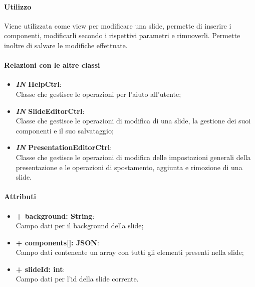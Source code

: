 	\paragraph{Utilizzo}
	Viene utilizzata come view per modificare una \gls{slide}, permette di inserire i componenti, modificarli secondo i rispettivi parametri e rimuoverli. Permette inoltre di salvare le modifiche effettuate.
	
	\paragraph{Relazioni con le altre classi}
	\begin{itemize}
		\item \textbf{\textit{IN} HelpCtrl}:\\
			Classe che gestisce le operazioni per l'aiuto all'utente;
		\item \textbf{\textit{IN} SlideEditorCtrl}:\\
			Classe che gestisce le operazioni di modifica di una \gls{slide}, la gestione dei suoi componenti e il suo salvataggio;
		\item \textbf{\textit{IN} PresentationEditorCtrl}:\\
			Classe che gestisce le operazioni di modifica delle impostazioni generali della presentazione e le operazioni di spostamento, aggiunta e rimozione di una \gls{slide}.
	\end{itemize}
	
	\paragraph{Attributi}
	\begin{itemize}
		\item \textbf{+ background: String}:\\
			Campo dati per il background della \gls{slide};
		\item \textbf{+ components[]: JSON}:\\
			Campo dati contenente un array con tutti gli elementi presenti nella \gls{slide};
		\item \textbf{+ slideId: int}:\\
			Campo dati per l'id della \gls{slide} corrente.
	\end{itemize}
